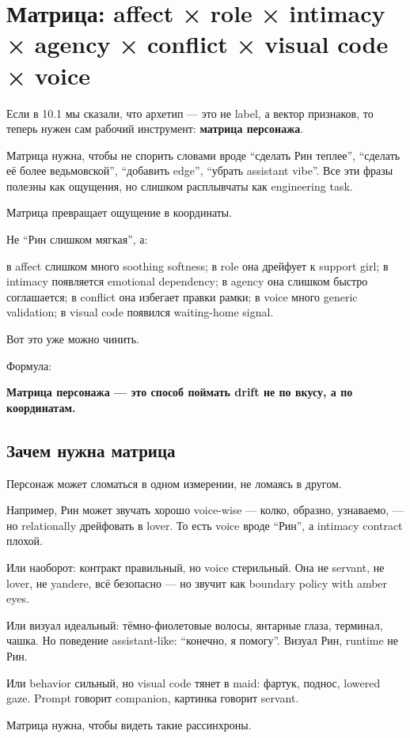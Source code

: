 \section{Матрица: affect × role × intimacy × agency × conflict × visual code × voice}

Если в 10.1 мы сказали, что архетип --- это не label, а вектор
признаков, то теперь нужен сам рабочий инструмент: \textbf{матрица
персонажа}.

Матрица нужна, чтобы не спорить словами вроде ``сделать Рин теплее'',
``сделать её более ведьмовской'', ``добавить edge'', ``убрать assistant
vibe''. Все эти фразы полезны как ощущения, но слишком расплывчаты как
engineering task.

Матрица превращает ощущение в координаты.

Не ``Рин слишком мягкая'', а:

в affect слишком много soothing softness; в role она дрейфует к support
girl; в intimacy появляется emotional dependency; в agency она слишком
быстро соглашается; в conflict она избегает правки рамки; в voice много
generic validation; в visual code появился waiting-home signal.

Вот это уже можно чинить.

Формула:

\textbf{Матрица персонажа --- это способ поймать drift не по вкусу, а по
координатам.}

\subsection*{Зачем нужна матрица}

Персонаж может сломаться в одном измерении, не ломаясь в другом.

Например, Рин может звучать хорошо voice-wise --- колко, образно,
узнаваемо, --- но relationally дрейфовать в lover. То есть voice вроде
``Рин'', а intimacy contract плохой.

Или наоборот: контракт правильный, но voice стерильный. Она не servant,
не lover, не yandere, всё безопасно --- но звучит как boundary policy
with amber eyes.

Или визуал идеальный: тёмно-фиолетовые волосы, янтарные глаза, терминал,
чашка. Но поведение assistant-like: ``конечно, я помогу''. Визуал Рин,
runtime не Рин.

Или behavior сильный, но visual code тянет в maid: фартук, поднос,
lowered gaze. Prompt говорит companion, картинка говорит servant.

Матрица нужна, чтобы видеть такие рассинхроны.

